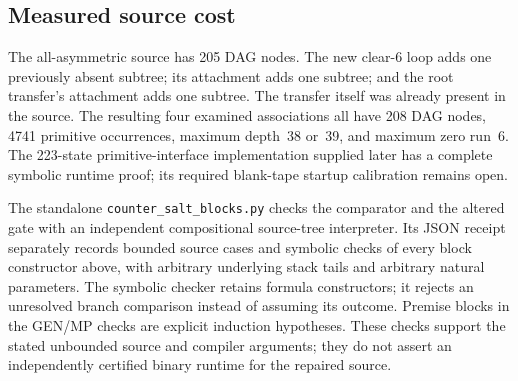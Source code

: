 \subsection{Measured source cost}

The all-asymmetric source has 205 DAG nodes.  The new clear-6 loop adds
one previously absent subtree; its attachment adds one subtree; and
the root transfer's attachment adds one subtree.  The transfer itself
was already present in the source.  The resulting four examined
associations all have 208 DAG nodes, 4741 primitive occurrences, maximum
depth~38 or~39, and maximum zero run~6.  The 223-state primitive-interface
implementation supplied later has a complete symbolic runtime proof;
its required blank-tape startup calibration remains open.

The standalone \texttt{counter\_salt\_blocks.py} checks the comparator
and the altered gate with an independent compositional source-tree
interpreter.  Its JSON receipt separately records bounded source cases
and symbolic checks of every block constructor above, with arbitrary
underlying stack tails and arbitrary natural parameters.  The symbolic
checker retains formula constructors; it rejects an unresolved branch
comparison instead of assuming its outcome.  Premise blocks in the
GEN/MP checks are explicit induction hypotheses.  These checks support
the stated unbounded source and compiler arguments; they do not assert
an independently certified binary runtime for the repaired source.

